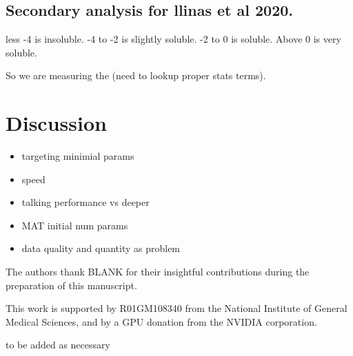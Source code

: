 \documentclass[journal=jmcmar,manuscript=article]{achemso}
\begin{document}
\subsection{Secondary analysis for llinas et al 2020.}
less -4 is insoluble. -4 to -2 is slightly soluble. -2 to 0 is soluble. Above 0 is very soluble.

So we are measuring the (need to lookup proper stats terms).

\section{Discussion}

\begin{itemize}
    \item targeting minimial params
    \item speed
    \item talking performance vs deeper
    \item MAT initial num params
    \item data quality and quantity as problem
\end{itemize}

\begin{acknowledgement}


The authors thank BLANK for their insightful contributions during the preparation of this manuscript.

This work is supported by R01GM108340 from the National Institute of General Medical Sciences, and by a GPU donation from the NVIDIA corporation.

\end{acknowledgement}

\begin{suppinfo}

to be added as necessary
\end{suppinfo}


\end{document}
